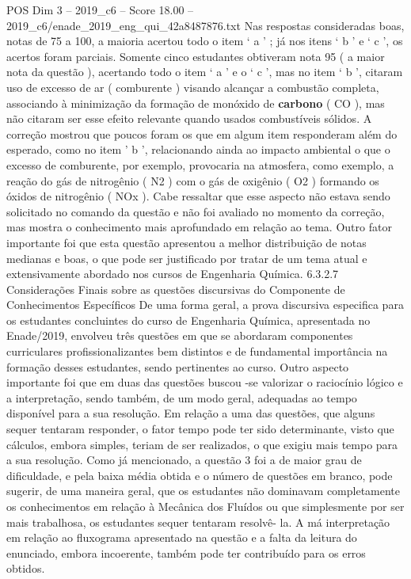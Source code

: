 \begin{textsample}{POS Dim 3 – 2019\_c6 – Score 18.00 – 2019\_c6/enade\_2019\_eng\_qui\_42a8487876.txt}
Nas respostas consideradas boas, notas de 75 a 100, a maioria acertou todo o item ‘ a ’ ; já nos itens ‘ b ’ e ‘ c ’, os acertos foram parciais.
Somente cinco estudantes obtiveram nota 95 ( a maior nota da questão ), acertando todo o item ‘ a ’ e o ‘ c ’, mas no item ‘ b ’, citaram uso de excesso de ar ( comburente ) visando alcançar a combustão completa, associando à minimização da formação de monóxido de \textbf{carbono} ( CO ), mas não citaram ser esse efeito relevante quando usados combustíveis sólidos.
A correção mostrou que poucos foram os que em algum item responderam além do esperado, como no item ’ b ’, relacionando ainda ao impacto ambiental o que o excesso de comburente, por exemplo, provocaria na atmosfera, como exemplo, a reação do gás de nitrogênio ( N2 ) com o gás de oxigênio ( O2 ) formando os óxidos de nitrogênio ( NOx ).
Cabe ressaltar que esse aspecto não estava sendo solicitado no comando da questão e não foi avaliado no momento da correção, mas mostra o conhecimento mais aprofundado em relação ao tema.
Outro fator importante foi que esta questão apresentou a melhor distribuição de notas medianas e boas, o que pode ser justificado por tratar de um tema atual e extensivamente abordado nos cursos de Engenharia Química. 6.3.2.7 Considerações Finais sobre as questões discursivas do Componente de Conhecimentos Específicos De uma forma geral, a prova discursiva especifica para os estudantes concluintes do curso de Engenharia Química, apresentada no Enade/2019, envolveu três questões em que se abordaram componentes curriculares profissionalizantes bem distintos e de fundamental importância na formação desses estudantes, sendo pertinentes ao curso.
Outro aspecto importante foi que em duas das questões buscou -se valorizar o raciocínio lógico e a interpretação, sendo também, de um modo geral, adequadas ao tempo disponível para a sua resolução.
Em relação a uma das questões, que alguns sequer tentaram responder, o fator tempo pode ter sido determinante, visto que cálculos, embora simples, teriam de ser realizados, o que exigiu mais tempo para a sua resolução.
Como já mencionado, a questão 3 foi a de maior grau de dificuldade, e pela baixa média obtida e o número de questões em branco, pode sugerir, de uma maneira geral, que os estudantes não dominavam completamente os conhecimentos em relação à Mecânica dos Fluídos ou que simplesmente por ser mais trabalhosa, os estudantes sequer tentaram resolvê- la.
A má interpretação em relação ao fluxograma apresentado na questão e a falta da leitura do enunciado, embora incoerente, também pode ter contribuído para os erros obtidos.

\end{textsample}
